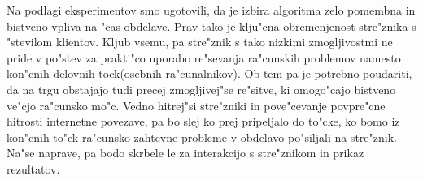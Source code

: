 Na podlagi eksperimentov smo ugotovili, da je izbira algoritma zelo pomembna in bistveno vpliva na "cas obdelave. Prav tako je klju"cna obremenjenost stre"znika s "stevilom klientov.
Kljub vsemu, pa stre"znik s tako nizkimi zmogljivostmi ne pride v po"stev za prakti"co uporabo re"sevanja ra"cunskih problemov namesto kon"cnih delovnih tock(osebnih ra"cunalnikov). Ob tem pa je potrebno poudariti, da na trgu obstajajo tudi precej
zmogljivej"se re"sitve, ki omogo"cajo bistveno ve"cjo ra"cunsko mo"c. Vedno hitrej"si stre"zniki in pove"cevanje povpre"cne hitrosti internetne povezave, pa bo slej ko prej pripeljalo do to"cke, ko bomo iz kon"cnih to"ck ra"cunsko zahtevne probleme v obdelavo po"siljali na stre"znik. Na"se naprave, pa bodo skrbele le za interakcijo s stre"znikom in prikaz rezultatov. 
